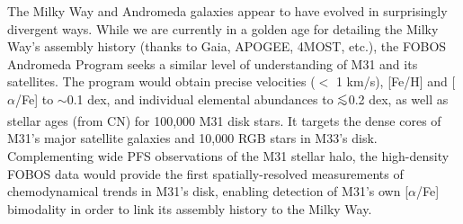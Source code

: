 \documentclass[oneside,11pt]{amsart}
\newcommand{\lam}{\lambda}
\DeclareRobustCommand{\lesssim}{%
\mathrel{\hskip-.5em\begin{array}{c}<\\[-8pt]\sim\end{array}\hskip-.5em}}
\begin{document}
The Milky Way and Andromeda galaxies appear to have evolved in surprisingly divergent ways.  While we are currently in a golden age for detailing the Milky Way's assembly history (thanks to Gaia, APOGEE, 4MOST, etc.), the FOBOS Andromeda Program seeks a similar level of understanding of M31 and its satellites.  The program would obtain precise velocities ($<$ 1 km/s), [Fe/H] and [$\alpha$/Fe] to $\sim$0.1 dex, and individual elemental abundances to $\lesssim$0.2 dex, as well as stellar ages (from CN) for 100,000 M31 disk stars.  It targets the dense cores of M31's major satellite galaxies and 10,000 RGB stars in M33's disk.  Complementing wide PFS observations of the M31 stellar halo, the high-density FOBOS data would provide the first spatially-resolved measurements of chemodynamical trends in M31's disk, enabling detection of M31's own [$\alpha$/Fe] bimodality in order to link its assembly history to the Milky Way.




\end{document}
